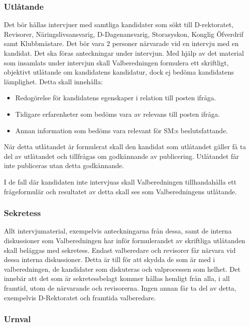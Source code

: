 \documentclass{dgovdoc}
\begin{document}
\subsubsection{Utlåtande}

Det bör hållas intervjuer med samtliga kandidater som sökt till D-rektoratet,
Revisorer, Näringslivsansvarig, D-Dagenansvarig, Storasyskon, Konglig Öfverdrif samt Klubbmästare.
Det bör vara 2 personer närvarade vid en intervju med en kandidat. Det ska föras
anteckningar under intervjun. Med hjälp av det material som insamlats under
intervjun skall Valberedningen formulera ett skriftligt, objektivt utlåtande om
kandidatens kandidatur, dock ej bedöma kandidatens lämplighet. Detta skall innehålla:

\begin{itemize}
\item Redogörelse för kandidatens egenskaper i relation till posten ifråga.
\item Tidigare erfarenheter som bedöms vara av relevans till posten ifråga.
\item Annan information som bedöms vara relevant för SM:s beslutsfattande.
\end{itemize}

När detta utlåtandet är formulerat skall den kandidat som utlåtandet gäller
få ta del av utlåtandet och tillfrågas om godkännande av publicering.
Utlåtandet får inte publiceras utan detta godkännande.

I de fall där kandidaten inte intervjuas skall Valberedningen tillhandahålla
ett frågeformulär och resultatet av detta skall ses som Valberedningens utlåtande.

\subsubsection{Sekretess}

Allt intervjumaterial, exempelvis anteckningarna från dessa, samt de interna
diskussioner som Valberedningen har inför formulerandet av skriftliga utlåtanden
skall beläggas med sekretess. Endast valberedare och revisorer får närvara vid
dessa interna diskussioner. Detta är till för att skydda de som är med i
valberedningen, de kandidater som diskuteras och valprocessen som helhet.
Det innebär att det som är sekretessbelagt kommer hållas hemligt från alla,
i all framtid, utom de närvarande och revisorerna. Ingen annan får ta del av detta,
exempelvis D-Rektoratet och framtida valberedare.

\subsubsection{Urnval}
\end{document}

